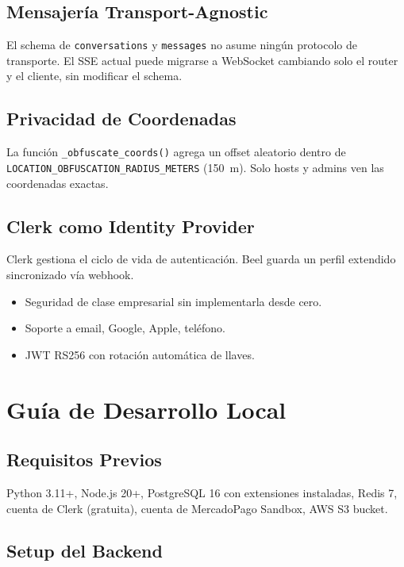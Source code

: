 \documentclass[12pt,a4paper]{report}
\begin{document}
\section{Mensajer\'ia Transport-Agnostic}

El schema de \texttt{conversations} y \texttt{messages} no asume ning\'un protocolo de
transporte. El SSE actual puede migrarse a WebSocket cambiando solo el router y el
cliente, sin modificar el schema.

\section{Privacidad de Coordenadas}

La funci\'on \texttt{\_obfuscate\_coords()} agrega un offset aleatorio dentro de
\texttt{LOCATION\_OBFUSCATION\_RADIUS\_METERS} (150~m). Solo hosts y admins ven las
coordenadas exactas.

\section{Clerk como Identity Provider}

Clerk gestiona el ciclo de vida de autenticaci\'on. Beel guarda un perfil extendido
sincronizado v\'ia webhook.
\begin{itemize}[leftmargin=*]
  \item Seguridad de clase empresarial sin implementarla desde cero.
  \item Soporte a email, Google, Apple, tel\'efono.
  \item JWT RS256 con rotaci\'on autom\'atica de llaves.
\end{itemize}

\chapter{Gu\'ia de Desarrollo Local}

\section{Requisitos Previos}

Python 3.11+, Node.js 20+, PostgreSQL 16 con extensiones instaladas, Redis 7,
cuenta de Clerk (gratuita), cuenta de MercadoPago Sandbox, AWS S3 bucket.

\section{Setup del Backend}
\end{document}

